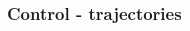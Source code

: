 \begin{frame}
\frametitle{Control - trajectories}
%
\begin{columns}
	\begin{column}{0.5\textwidth}
	\begin{figure}
	\end{figure}
	\end{column}
	\begin{column}{0.5\textwidth}
	\begin{figure}
	\end{figure}
	\end{column}
\end{columns}
\end{frame}
%